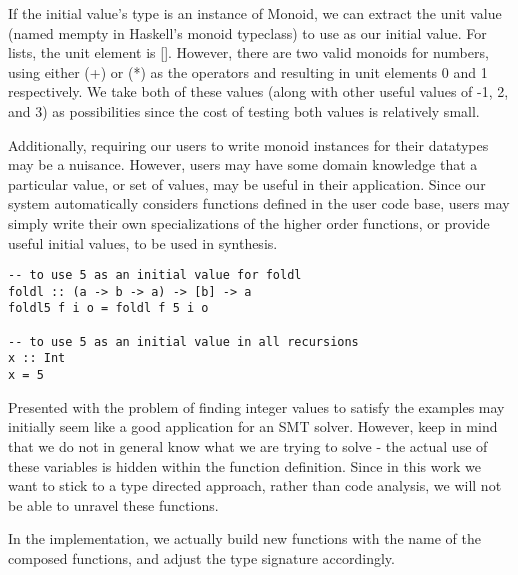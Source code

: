 If the initial value's type is an instance of Monoid, we can extract the unit value (named mempty in Haskell's monoid typeclass\cite{}) to use as our initial value. For lists, the unit element is []. However, there are two valid monoids for numbers, using either (+) or (*) as the operators and resulting in unit elements 0 and 1 respectively. We take both of these values (along with other useful values of -1, 2, and 3) as possibilities since the cost of testing both values is relatively small.

Additionally, requiring our users to write monoid instances for their datatypes may be a nuisance. However, users may have some domain knowledge that a particular value, or set of values, may be useful in their application. Since our system automatically considers functions defined in the user code base, users may simply write their own specializations of the higher order functions, or provide useful initial values, to be used in synthesis. 

\begin{lstlisting}
-- to use 5 as an initial value for foldl
foldl :: (a -> b -> a) -> [b] -> a
foldl5 f i o = foldl f 5 i o

-- to use 5 as an initial value in all recursions
x :: Int
x = 5
\end{lstlisting}

Presented with the problem of finding integer values to satisfy the examples may initially seem like a good application for an SMT solver. However, keep in mind that we do not in general know what we are trying to solve - the actual use of these variables is hidden within the function definition. Since in this work we want to stick to a type directed approach, rather than code analysis, we will not be able to unravel these functions.

In the implementation, we actually build new functions with the name of the composed functions, and adjust the type signature accordingly.



